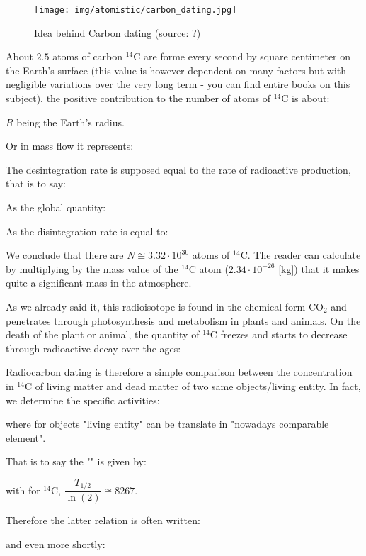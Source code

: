 	\begin{figure}[H]
		\begin{center}
		\texttt{[image: img/atomistic/carbon\_dating.jpg]}
		\end{center}	
		\caption{Idea behind Carbon dating (source: ?)}
	\end{figure}
	
	About $2.5$ atoms of carbon $^{14}\mathrm{C}$ are forme every second by square centimeter on the Earth's surface (this value is however dependent on many factors but with negligible variations over the very long term - you can find entire books on this subject), the positive contribution to the number of atoms of  $^{14}\mathrm{C}$ is about:
	
	$R$ being the Earth's radius.
	
	Or in mass flow it represents:
	
	The desintegration rate is supposed equal to the rate of radioactive production, that is to say:
	
	As the global quantity:
	
	As the disintegration rate is equal to:
	
	We conclude that there are $N\cong 3.32\cdot 10^{30}$ atoms of $^{14}\mathrm{C}$. The reader can calculate by multiplying by the mass value of the  $^{14}\mathrm{C}$ atom ($2.34\cdot 10^{-26}$ [kg]) that it makes quite a significant mass in the atmosphere.
	
	As we already said it, this radioisotope is found in the chemical form $\mathrm{CO}_2$ and penetrates through photosynthesis and metabolism in plants and animals. On the death of the plant or animal, the quantity of $^{14}\mathrm{C}$ freezes and starts to decrease through radioactive decay over the ages:
	
	Radiocarbon dating is therefore a simple comparison between the concentration in  $^{14}\mathrm{C}$ of living matter and dead matter of two same objects/living entity. In fact, we determine the specific activities:
	
	where for objects "living entity" can be translate in "nowadays comparable element".
	
	That is to say the "" is given by:
	
	with for $^{14}\mathrm{C}$, $\dfrac{T_{1/2}}{\ln(2)}\cong 8267$.
	
	Therefore the latter relation is often written:
	
	and even more shortly:
	

